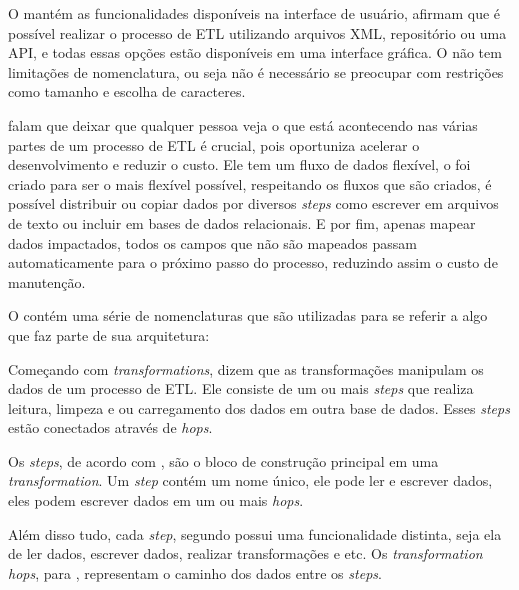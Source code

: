 O \pdi mantém as funcionalidades disponíveis na interface de usuário,  afirmam que é possível realizar o processo de ETL utilizando arquivos XML, repositório ou uma API, e todas essas opções estão disponíveis em uma interface gráfica. O \pdi não tem limitações de nomenclatura, ou seja não é necessário se preocupar com restrições como tamanho e escolha de caracteres.

 falam que deixar que qualquer pessoa veja o que está acontecendo nas várias partes de um processo de ETL é crucial, pois oportuniza acelerar o desenvolvimento e reduzir o custo. Ele tem um fluxo de dados flexível, o \pdi foi criado para ser o mais flexível possível, respeitando os fluxos que são criados, é possível distribuir ou copiar dados por diversos \textit{steps} como escrever em arquivos de texto ou incluir em bases de dados relacionais. E por fim, apenas mapear dados impactados, todos os campos que não são mapeados passam automaticamente para o próximo passo do processo, reduzindo assim o custo de manutenção.

O \pdi contém uma série de nomenclaturas que são utilizadas para se referir a algo que faz parte de sua arquitetura:

Começando com \textit{transformations},  dizem que as transformações manipulam os dados de um processo de ETL. Ele consiste de um ou mais \textit{steps} que realiza leitura, limpeza e ou carregamento dos dados em outra base de dados. Esses \textit{steps} estão conectados através de \textit{hops}.

Os \textit{steps}, de acordo com , são o bloco de construção principal em uma \textit{transformation}. Um \textit{step} contém um nome único, ele pode ler e escrever dados, eles podem escrever dados em um ou mais \textit{hops}. 

Além disso tudo, cada \textit{step}, segundo  possui uma funcionalidade distinta, seja ela de ler dados, escrever dados, realizar transformações e etc. Os \textit{transformation hops}, para , representam o caminho dos dados entre os \textit{steps}. 




